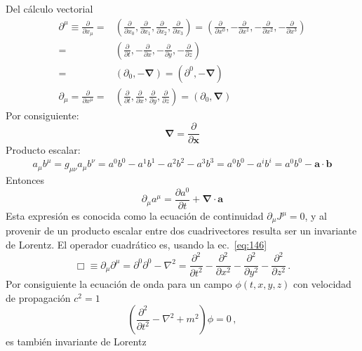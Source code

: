 \begin{frame}
Del cálculo vectorial
\begin{align}
  \partial^\mu\equiv\frac{\partial}{\partial x_\mu}=&
  \left(
    \frac{\partial}{\partial x_0},\frac{\partial}{\partial x_1},\frac{\partial}{\partial x_2},\frac{\partial}{\partial x_3}
  \right)=\left(
    \frac{\partial}{\partial x^0},-\frac{\partial}{\partial x^1},-\frac{\partial}{\partial x^2},-\frac{\partial}{\partial x^3}
  \right)\nonumber\\
  =&\left(
    \frac{\partial}{\partial t},-\frac{\partial}{\partial x},-\frac{\partial}{\partial y},-\frac{\partial}{\partial z}
  \right)\nonumber\\
  =&(\partial_0,-\boldsymbol{\nabla})=(\partial^0,-\boldsymbol{\nabla})\\
  \partial_\mu=\frac{\partial}{\partial x^\mu}=&\left(
    \frac{\partial}{\partial t},\frac{\partial}{\partial x},\frac{\partial}{\partial y},\frac{\partial}{\partial z}
  \right)
  =(\partial_0,\boldsymbol{\nabla})
\end{align}
Por consiguiente:
\begin{equation}
  \label{eq:nabla}
  \boldsymbol{\nabla}=\frac{\partial}{\partial\mathbf{x}}
\end{equation}
Producto escalar:
\begin{equation}
  a_\mu b^\mu=g_{\mu\nu}a_\mu b^\nu=a^0b^0-a^1b^1-a^2b^2-a^3b^3=a^0b^0-a^i b^i=a^0b^0-\mathbf{a}\cdot \mathbf{b}
\end{equation}
Entonces
\begin{equation}
  \partial_\mu a^\mu=\frac{\partial a^0}{\partial t}+\boldsymbol{\nabla}\cdot\mathbf{a}
\end{equation}
Esta expresión es conocida como la ecuaci\'on de continuidad $\partial_\mu J^\mu=0$, y al provenir de un producto escalar entre dos cuadrivectores resulta ser un invariante de Lorentz.
El operador cuadrático es, usando la ec.~\eqref{eq:146}
\begin{equation}
  \label{eq:dalambertian}
  \Box\equiv \partial_\mu\partial^\mu=\partial^0\partial^0-\nabla^2 =\frac{\partial^2}{\partial t^2}-\frac{\partial^2}{\partial x^2}-\frac{\partial^2}{\partial y^2}-\frac{\partial^2}{\partial z^2}\,.
\end{equation}
Por consiguiente la ecuaci\'on de onda para un campo $\phi(t,x,y,z)$  con velocidad de propagación $c^2=1$
\begin{equation}
  \left(
\frac{\partial^2}{\partial t^2}-\nabla^2+m^2
  \right)\phi=0\,,
\end{equation}
es también invariante de Lorentz
\end{frame}

